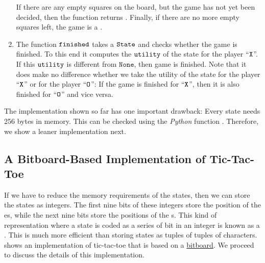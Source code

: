 \begin{enumerate}
      If there are any empty squares on the board, but the game has not yet been decided,
      then the function returns .  Finally, if there are no more empty squares left, the game is a
      . 
\item The function $\texttt{finished}$ takes a $\texttt{State}$ and checks whether the game is finished.
      To this end it computes the $\texttt{utility}$ of the state for the player ``$\texttt{X}$''.  
      If this $\texttt{utility}$ is different from $\mathtt{None}$, then game is finished.  Note that it does make no
      difference whether we take the utility of the state for the player ``$\texttt{X}$'' or for the player
      ``$\texttt{O}$'': If the game is finished for  ``$\texttt{X}$'', then it is also finished for ``$\texttt{O}$'' and vice versa.
\end{enumerate}
The implementation shown so far has one important drawback: Every state needs 256 bytes in memory.
This can be checked using the \textsl{Python} function .
Therefore, we show a leaner implementation next.

\subsection{A Bitboard-Based Implementation of Tic-Tac-Toe}
If we have to reduce the memory requirements of the states, then we can store the states as integers.  The
first nine bits of these integers store the position of the es, while the next nine bits store the
positions of the s.  This kind of representation where a state is coded as a series of bit in an
integer is known as a  .  This is much more efficient than storing states as
tuples of tuples of characters.   shows an implementation of tic-tac-toe that
is based on a \href{https://en.wikipedia.org/wiki/Bitboard}{bitboard}.  We proceed to discuss the details of
this implementation.

